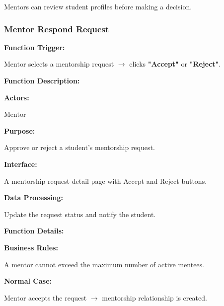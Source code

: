 Mentors can review student profiles before making a decision.

%

\subsubsection{Mentor Respond Request}

\textbf{Function Trigger:}

Mentor selects a mentorship request $\rightarrow$ clicks \textbf{"Accept"} or \textbf{"Reject"}.

\vspace{0.3cm}

\textbf{Function Description:}

\textbf{Actors:}

Mentor

\vspace{0.2cm}

\textbf{Purpose:}

Approve or reject a student's mentorship request.

\vspace{0.2cm}

\textbf{Interface:}

A mentorship request detail page with Accept and Reject buttons.

\vspace{0.2cm}

\textbf{Data Processing:}

Update the request status and notify the student.

\vspace{0.3cm}

\textbf{Function Details:}

\textbf{Business Rules:}

A mentor cannot exceed the maximum number of active mentees.

\textbf{Normal Case:}

Mentor accepts the request $\rightarrow$ mentorship relationship is created.

